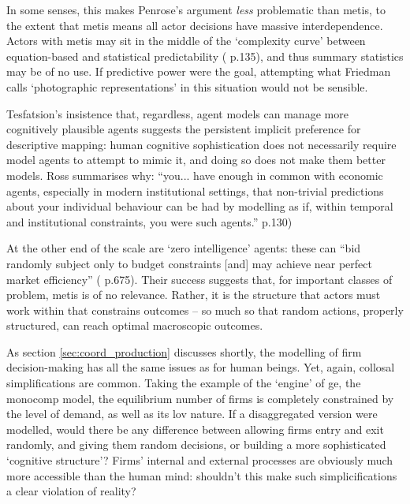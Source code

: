 In some senses, this makes Penrose's argument \emph{less} problematic than metis, to the extent that metis means all actor decisions have massive interdependence. Actors with metis may sit in the middle of the `complexity curve' between equation-based and statistical predictability (\citealt{flake_computational_1998} p.135), and thus summary statistics may be of no use. If predictive power were the goal, attempting what Friedman calls `photographic representations' in this situation would not be sensible.

Tesfatsion's insistence that, regardless, agent models can manage more cognitively plausible agents suggests the persistent implicit preference for descriptive mapping: human cognitive sophistication does not necessarily require model agents to attempt to mimic it, and doing so does not make them better models. Ross summarises why: ``you... have enough in common with economic agents, especially in modern institutional settings, that non-trivial predictions about your individual behaviour can be had by modelling as if, within temporal and institutional constraints, you were such agents.'' \citealt{ross_economics_2008} p.130)

At the other end of the scale are `zero intelligence' agents: these can ``bid randomly subject only to budget constraints [and] may achieve near perfect market efficiency'' (\citealt{conlisk_why_1996} p.675). Their success suggests that, for important classes of problem, metis is of no relevance. Rather, it is the structure that actors must work within that constrains outcomes – so much so that random actions, properly structured, can reach optimal macroscopic outcomes.  

As section \ref{sec:coord_production} discusses shortly, the modelling of firm decision-making has all the same issues as for human beings. Yet, again, collosal simplifications are common. Taking the example of the `engine' of \gls{ge}, the \gls{monocomp} model, the equilibrium number of firms is completely constrained by the level of demand, as well as its \gls{lov} nature. If a disaggregated version were modelled, would there be any difference between allowing firms entry and exit randomly, and giving them random decisions, or building a more sophisticated `cognitive structure'? Firms' internal and external processes are obviously much more accessible than the human mind: shouldn't this make such simplicifications a clear violation of reality?

